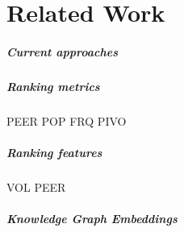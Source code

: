 \chapter{Related Work}
\label{ch:relatedwork}


\paragraph{Current approaches}


\paragraph{Ranking metrics}
\ac{PEER}
\ac{POP}
\ac{FRQ}
\ac{PIVO}

\paragraph{Ranking features}
\ac{VOL}
\ac{PEER}

\paragraph{Knowledge Graph Embeddings}


\cite{alam2020affinity}


\cite{qianunderstanding}


\cite{yang2020understanding}


\cite{arnaout2020enriching}


\cite{ahrabian2020structure}


\cite{kotnis2017analysis}


